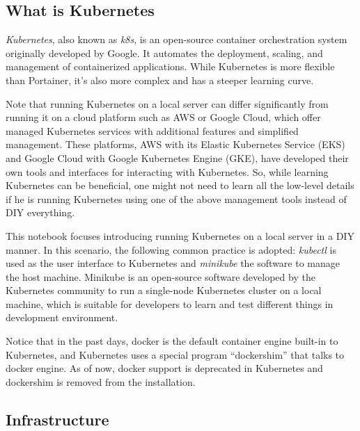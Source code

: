 \subsection{What is Kubernetes}

\textit{Kubernetes}, also known as \textit{k8s}, is an open-source container orchestration system originally developed by Google. It automates the deployment, scaling, and management of containerized applications. While Kubernetes is more flexible than Portainer, it's also more complex and has a steeper learning curve.

Note that running Kubernetes on a local server can differ significantly from running it on a cloud platform such as AWS or Google Cloud, which offer managed Kubernetes services with additional features and simplified management. These platforms, AWS with its Elastic Kubernetes Service (EKS) and Google Cloud with Google Kubernetes Engine (GKE), have developed their own tools and interfaces for interacting with Kubernetes. So, while learning Kubernetes can be beneficial, one might not need to learn all the low-level details if he is running Kubernetes using one of the above management tools instead of DIY everything.

This notebook focuses introducing running Kubernetes on a local server in a DIY manner. In this scenario, the following common practice is adopted: \textit{kubectl} is used as the user interface to Kubernetes and \textit{minikube} the software to manage the host machine. Minikube is an open-source software developed by the Kubernetes community to run a single-node Kubernetes cluster on a local machine, which is suitable for developers to learn and test different things in development environment.

Notice that in the past days, docker is the default container engine built-in to Kubernetes, and Kubernetes uses a special program ``dockershim'' that talks to docker engine. As of now, docker support is deprecated in Kubernetes and dockershim is removed from the installation.

\subsection{Infrastructure}

